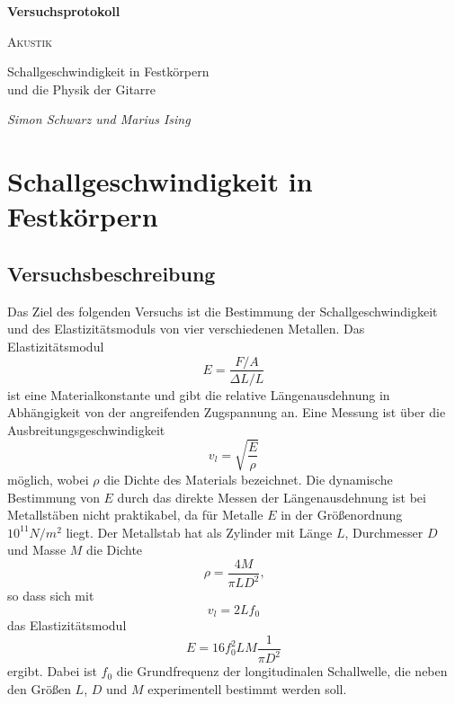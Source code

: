 \documentclass[a4paper, 12pt]{scrartcl}
\begin{document}
\begin{titlepage}
	\centering
	{\Huge\bfseries Versuchsprotokoll\par}
	\vspace{2cm}
	{\scshape\LARGE Akustik \par}
	\vspace{1cm}
	{\Large Schallgeschwindigkeit in Festkörpern \\ und die Physik der Gitarre\par}
	\vfill
	{\large\itshape Simon Schwarz und Marius Ising\par}

	\vfill
\end{titlepage}

\tableofcontents
\newpage

\section{Schallgeschwindigkeit in Festkörpern}


\subsection{Versuchsbeschreibung}

Das Ziel des folgenden Versuchs ist die Bestimmung der Schallgeschwindigkeit und des Elastizitätsmoduls von vier verschiedenen Metallen. Das Elastizitätsmodul 
$$E = \frac{F/A}{\Delta L/L}$$
ist eine Materialkonstante und gibt die relative Längenausdehnung in Abhängigkeit von der angreifenden Zugspannung an. Eine Messung ist über die Ausbreitungsgeschwindigkeit 
$$v_l = \sqrt{\frac{E}{\rho}}$$
möglich, wobei $\rho$ die Dichte des Materials bezeichnet. Die dynamische Bestimmung von $E$ durch das direkte Messen der Längenausdehnung ist bei Metallstäben nicht praktikabel, da für Metalle $E$ in der Größenordnung $10^{11} N/m^2$ liegt. Der Metallstab hat als Zylinder mit Länge $L$, Durchmesser $D$ und Masse $M$ die Dichte
\begin{equation}\label{eq:rho}
\rho = \frac{4M}{\pi LD^2}\text{,}
\end{equation}
so dass sich mit
\begin{equation}\label{eq:ges}
v_l = 2L f_0
\end{equation}
das Elastizitätsmodul
\begin{equation}\label{eq:ela}
E = 16 f_0^2 LM \frac{1}{\pi D^2}
\end{equation}
ergibt. Dabei ist $f_0$ die Grundfrequenz der longitudinalen Schallwelle, die neben den Größen $L$, $D$ und $M$ experimentell bestimmt werden soll.
\end{document}
